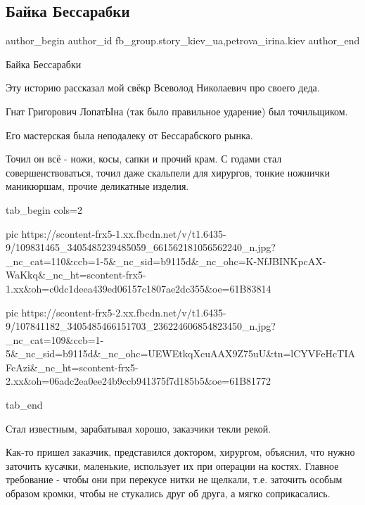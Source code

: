  
 
 
 
 
 
\subsection{Байка Бессарабки}
\label{sec:14_07_2020.fb.fb_group.story_kiev_ua.1.bajka_bessarabki}
 
\ifcmt
 author_begin
   author_id fb_group.story_kiev_ua,petrova_irina.kiev
 author_end
\fi

Байка Бессарабки

Эту историю рассказал мой свёкр Всеволод Николаевич  про своего деда.

Гнат Григорович ЛопатЫна (так было правильное ударение) был  точильщиком.

Его мастерская была  неподалеку от Бессарабского рынка.

Точил он всё - ножи, косы, сапки и прочий крам. С годами стал
совершенствоваться, точил даже скальпели для хирургов, тонкие ножнички
маникюршам, прочие деликатные изделия.

\ifcmt
  tab_begin cols=2

     pic https://scontent-frx5-1.xx.fbcdn.net/v/t1.6435-9/109831465_3405485239485059_661562181056562240_n.jpg?_nc_cat=110&ccb=1-5&_nc_sid=b9115d&_nc_ohc=K-NfJBINKpcAX-WaKkq&_nc_ht=scontent-frx5-1.xx&oh=c0dc1deea439ed06157c1807ae2dc355&oe=61B83814

     pic https://scontent-frx5-2.xx.fbcdn.net/v/t1.6435-9/107841182_3405485466151703_236224606854823450_n.jpg?_nc_cat=109&ccb=1-5&_nc_sid=b9115d&_nc_ohc=UEWEtkqXcuAAX9Z75uU&tn=lCYVFeHcTIAFcAzi&_nc_ht=scontent-frx5-2.xx&oh=06adc2ea0ee24b9ccb941375f7d185b5&oe=61B81772

  tab_end
\fi

Стал известным, зарабатывал  хорошо, заказчики текли рекой.

Как-то пришел заказчик, представился доктором,  хирургом, объяснил, что нужно
заточить кусачки, маленькие, использует их при операции на костях. Главное
требование - чтобы они при перекусе нитки не щелкали, т.е. заточить особым
образом кромки, чтобы не стукались друг об друга, а мягко соприкасались.

